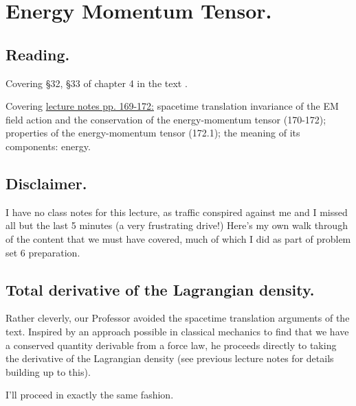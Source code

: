 %
%

\chapter{Energy Momentum Tensor.}
\label{chap:relativisticElectrodynamicsL22}
{}
\date{Mar 23, 2011}

\beginArtNoToc

\section{Reading.}

Covering \S 32, \S 33 of chapter 4 in the text \citep{landau1980classical}.

Covering \href{http://www.physics.utoronto.ca/~poppitz/epoppitz/PHY450_files/RelEMpp166-180.pdf}{lecture notes pp. 169-172:} spacetime translation invariance of the EM field action and the conservation of the energy-momentum tensor (170-172); properties of the energy-momentum tensor (172.1); the meaning of its components: energy.

\section{Disclaimer.}

I have no class notes for this lecture, as traffic conspired against me and I missed all but the last 5 minutes (a very frustrating drive!)  Here's my own walk through of the content that we must have covered, much of which I did as part of problem set 6 preparation.

\section{Total derivative of the Lagrangian density.}

Rather cleverly, our Professor avoided the spacetime translation arguments of the text.  Inspired by an approach possible in classical mechanics to find that we have a conserved quantity derivable from a force law, he proceeds directly to taking the derivative of the Lagrangian density (see previous lecture notes for details building up to this).

I'll proceed in exactly the same fashion.

